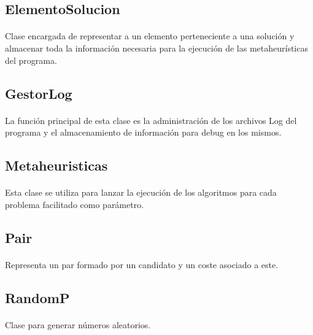 \documentclass{article}
\begin{document}
	\subsection{ElementoSolucion}
	
	\paragraph{}Clase encargada de representar a un elemento perteneciente a una solución y almacenar toda la información necesaria para la ejecución de las metaheurísticas del programa.
	
	\subsection{GestorLog}
	
	\paragraph{}La función principal de esta clase es la administración de los archivos Log del programa y el almacenamiento de información para debug en los mismos.
	
	\subsection{Metaheuristicas}
	
	\paragraph{}Esta clase se utiliza para lanzar la ejecución de los algoritmos para cada problema facilitado como parámetro.
	
	\subsection{Pair}
	
	\paragraph{}Representa un par formado por un candidato y un coste asociado a este.
	
	\subsection{RandomP}
	
	\paragraph{}Clase para generar números aleatorios.
	
\end{document}
